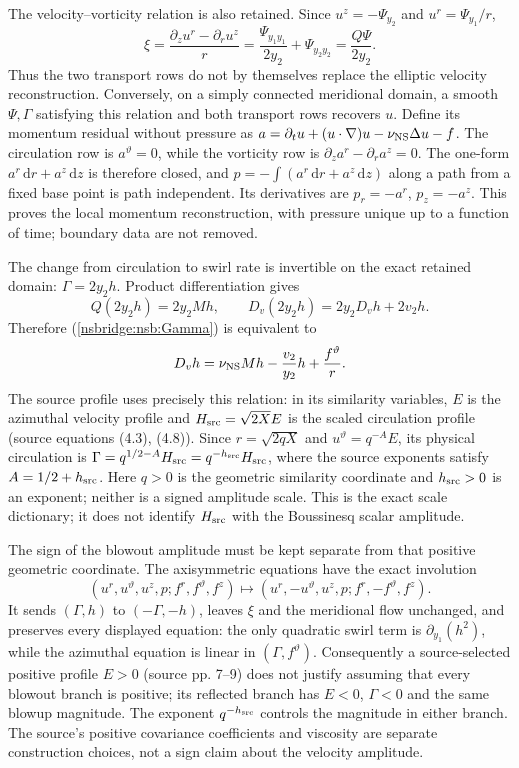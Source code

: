 The velocity--vorticity relation is also retained. Since
$u^z=-\Psi_{y_2}$ and $u^r=\Psi_{y_1}/r$,
\[
 \xi=\frac{\partial_z u^r-\partial_r u^z}{r}
     =\frac{\Psi_{y_1y_1}}{2y_2}+\Psi_{y_2y_2}
     =\frac{Q\Psi}{2y_2}.
\]
Thus the two transport rows do not by themselves replace the elliptic
velocity reconstruction. Conversely, on a simply connected meridional
domain, a smooth $\Psi,\Gamma$ satisfying this relation and both transport
rows recovers $u$. Define its momentum residual without pressure as
$a=\partial_tu+(u\cdot\nabla)u-\nu_{\rm NS}\Delta u-f$.
The circulation row is $a^\vartheta=0$, while the vorticity row is
$\partial_z a^r-\partial_r a^z=0$. The one-form
$a^r\,\mathrm dr+a^z\,\mathrm dz$ is therefore closed, and
$p=-\int(a^r\,\mathrm dr+a^z\,\mathrm dz)$ along a path from a fixed
base point is path independent. Its derivatives are $p_r=-a^r$,
$p_z=-a^z$. This proves the local momentum reconstruction, with pressure
unique up to a function of time; boundary data are not removed.

The change from circulation to swirl rate is invertible on the exact retained
domain: $\Gamma=2y_2h$. Product differentiation gives
\[
 Q(2y_2h)=2y_2Mh,\qquad
 D_v(2y_2h)=2y_2D_vh+2v_2h.
\]
Therefore (\ref{nsbridge:nsb:Gamma}) is equivalent to
\begin{equation}
 D_vh=\nu_{\rm NS}Mh-\frac{v_2}{y_2}h+\frac{f^\vartheta}{r}.
 \label{nsbridge:nsb:h}
\end{equation}
The source profile uses precisely this relation: in its similarity variables,
$E$ is the azimuthal velocity profile and
$H_{\rm src}=\sqrt{2X}E$ is the scaled circulation profile (source equations
(4.3), (4.8)). Since $r=\sqrt{2qX}$ and
$u^\vartheta=q^{-A}E$, its physical circulation is
$\Gamma=q^{1/2-A}H_{\rm src}=q^{-h_{\rm src}}H_{\rm src}$,
where the source exponents satisfy $A=1/2+h_{\rm src}$. Here $q>0$ is the
geometric similarity coordinate and $h_{\rm src}>0$ is an exponent; neither
is a signed amplitude scale. This is the exact scale dictionary; it does not
identify $H_{\rm src}$ with the Boussinesq scalar amplitude.

The sign of the blowout amplitude must be kept separate from that positive
geometric coordinate. The axisymmetric equations have the exact involution
\[
 (u^r,u^\vartheta,u^z,p;f^r,f^\vartheta,f^z)
 \longmapsto
 (u^r,-u^\vartheta,u^z,p;f^r,-f^\vartheta,f^z).
 \label{nsbridge:nsb:sign}
\]
It sends $(\Gamma,h)$ to $(-\Gamma,-h)$, leaves $\xi$ and the meridional
flow unchanged, and preserves every displayed equation: the only quadratic
swirl term is $\partial_{y_1}(h^2)$, while the azimuthal equation is linear in
$(\Gamma,f^\vartheta)$. Consequently a source-selected positive profile
$E>0$ (source pp. 7--9) does not justify assuming that every blowout branch is
positive; its reflected branch has $E<0$, $\Gamma<0$ and the same blowup
magnitude. The exponent $q^{-h_{\rm src}}$ controls the magnitude in either
branch. The source's positive covariance coefficients and viscosity are
separate construction choices, not a sign claim about the velocity amplitude.

